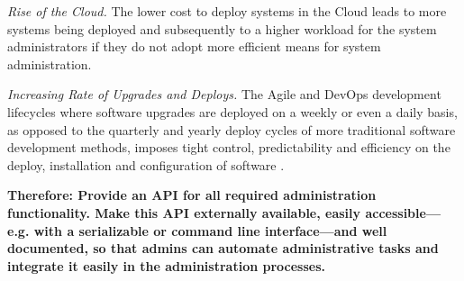 \textit{Rise of the Cloud.} The lower cost to deploy systems in the Cloud leads to more systems being deployed and subsequently to a higher workload for the system administrators if they do not adopt more efficient means for system administration. 

\textit{Increasing Rate of Upgrades and Deploys.} The Agile and DevOps development lifecycles where software upgrades are deployed on a weekly or even a  daily basis, as opposed to the quarterly and yearly deploy cycles of more traditional software development methods, imposes tight control, predictability and efficiency on the deploy, installation and configuration of software \cite{Humble2010}.

\begin{center}
   
\end{center}

\textbf{Therefore: Provide an API for all required administration functionality. Make this API externally available, easily accessible---e.g. with a serializable or command line interface---and well documented, so that admins can automate administrative tasks and integrate it easily in the administration processes.}\\






